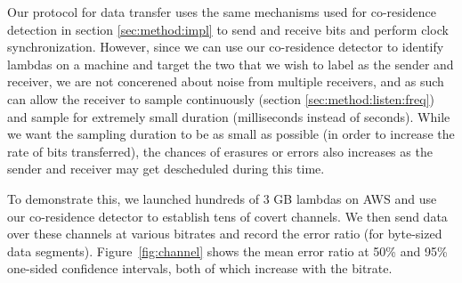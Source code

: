 Our protocol for data transfer uses the same mechanisms used for co-residence
detection in section \ref{sec:method:impl} to send and receive bits and perform clock
synchronization. However, since we can use our co-residence detector to identify
lambdas on a machine and target the two that we wish to label as the sender and
receiver, we are not concerened about noise from multiple receivers, and as such
can allow the receiver to sample continuously (section \ref{sec:method:listen:freq}) 
and sample for extremely small duration (milliseconds instead of seconds). While we want the
sampling duration to be as small as possible (in order to increase the rate of
bits transferred), the chances of erasures or errors also increases as the
sender and receiver may get descheduled during this time. 

To demonstrate this, we launched hundreds of 3 GB lambdas on AWS and use our
co-residence detector to establish tens of covert channels. We then send data
over these channels at various bitrates and record the error ratio (for
byte-sized data segments). Figure~\ref{fig:channel} shows the mean error ratio
at 50\% and 95\% one-sided confidence intervals, both of which increase with the bitrate.


